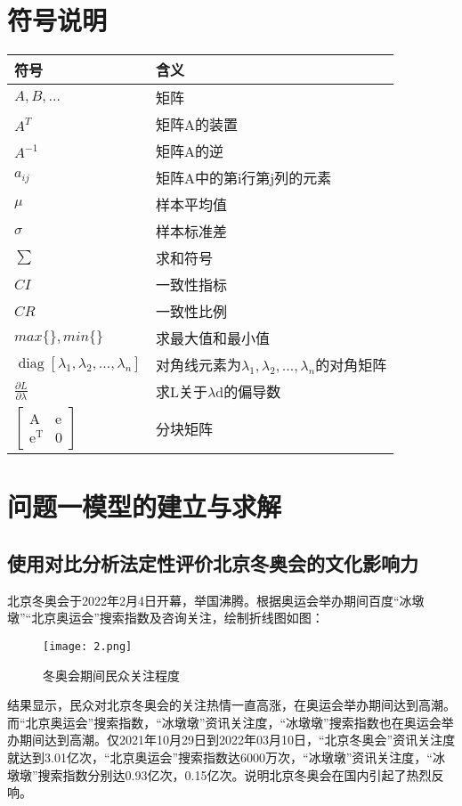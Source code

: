 \documentclass[withoutpreface,bwprint]{cumcmthesis} %
\begin{document}
\clearpage
\section{符号说明}
\begin{table}[h]
	\begin{center}
		\begin{tabular}{p{240pt}p{250pt}}
			\toprule
			符号    & 含义  \\
			\midrule
			$A,B,\dots$     &   矩阵 \\
			$A^T$  &  矩阵A的装置 \\
			$A^{-1}$  &  矩阵A的逆 \\
			$a_{ij}$ & 矩阵A中的第i行第j列的元素   \\
			$\mu$  &  样本平均值 \\	
			$\sigma$  &  样本标准差 \\	
			$\sum$  &  求和符号 \\
			$CI$  & 一致性指标 \\
			$CR$  & 一致性比例\\
			$max\{\},min\{\}$  & 求最大值和最小值 \\	
		
			$\operatorname{diag}\left[\lambda_{1},\lambda_{2},\dots,\lambda_{n}\right]$  & 对角线元素为$\lambda_{1},\lambda_{2},\dots,\lambda_{n}$的对角矩阵\\
				$\frac{\partial L}{\partial \lambda}$  &  求L关于$\lambda$d的偏导数    \\	
			$ \left[\begin{array}{cc}\mathrm{A} & \mathrm{e} \\ \mathrm{e}^{\mathrm{T}} & 0\end{array}\right]$  &  分块矩阵 \\
		
			
			\bottomrule
		\end{tabular}
	\end{center}
\end{table}

\section{问题一模型的建立与求解}
\subsection{使用对比分析法定性评价北京冬奥会的文化影响力}
北京冬奥会于2022年2月4日开幕，举国沸腾。根据奥运会举办期间百度“冰墩墩”“北京奥运会”搜索指数及咨询关注，绘制折线图如图：
\begin{figure}[H]
	\centering
	\texttt{[image: 2.png]}
	\caption{冬奥会期间民众关注程度}
	\label{2}
\end{figure}
结果显示，民众对北京冬奥会的关注热情一直高涨，在奥运会举办期间达到高潮。而“北京奥运会”搜索指数，“冰墩墩”资讯关注度，“冰墩墩”搜索指数也在奥运会举办期间达到高潮。仅2021年10月29日到2022年03月10日，“北京冬奥会”资讯关注度就达到3.01亿次，“北京奥运会”搜索指数达6000万次，“冰墩墩”资讯关注度，“冰墩墩”搜索指数分别达0.93亿次，0.15亿次。说明北京冬奥会在国内引起了热烈反响。
\end{document}
